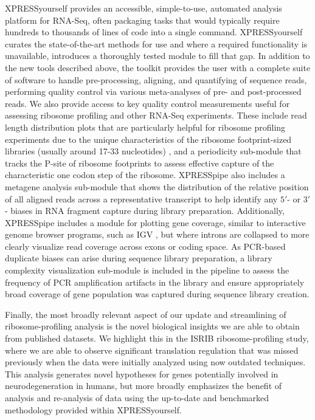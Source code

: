 \documentclass[10pt, oneside]{article}
\begin{document}
\begin{multicols}{2}
XPRESSyourself provides an accessible, simple-to-use, automated analysis platform for RNA-Seq, often packaging tasks that would typically require hundreds to thousands of lines of code into a single command. XPRESSyourself curates the state-of-the-art methods for use and where a required functionality is unavailable, introduces a thoroughly tested module to fill that gap. In addition to the new tools described above, the toolkit provides the user with a complete suite of software to handle pre-processing, aligning, and quantifying of sequence reads, performing quality control via various meta-analyses of pre- and post-processed reads. We also provide access to key quality control measurements useful for assessing ribosome profiling and other RNA-Seq experiments. These include read length distribution plots that are particularly helpful for ribosome profiling experiments due to the unique characteristics of the ribosome footprint-sized libraries (usually around 17-33 nucleotides) \cite{fp_range}, and a periodicity sub-module that tracks the P-site of ribosome footprints to assess effective capture of the characteristic one codon step of the ribosome. XPRESSpipe also includes a metagene analysis sub-module that shows the distribution of the relative position of all aligned reads across a representative transcript to help identify any $5'$- or $3'$- biases in RNA fragment capture during library preparation. Additionally, XPRESSpipe includes a module for plotting gene coverage, similar to interactive genome browser programs, such as IGV \cite{igv}, but where introns are collapsed to more clearly visualize read coverage across exons or coding space. As PCR-based duplicate biases can arise during sequence library preparation, a library complexity visualization sub-module is included in the pipeline to assess the frequency of PCR amplification artifacts in the library and ensure appropriately broad coverage of gene population was captured during sequence library creation. \par

Finally, the most broadly relevant aspect of our update and streamlining of ribosome-profiling analysis is the novel biological insights we are able to obtain from published datasets. We highlight this in the ISRIB ribosome-profiling study, where we are able to observe significant translation regulation that was missed previously when the data were initially analyzed using now outdated techniques. This analysis generates novel hypotheses for genes potentially involved in neurodegeneration in humans, but more broadly emphasizes the benefit of analysis and re-analysis of data using the up-to-date and benchmarked methodology provided within XPRESSyourself.


\end{multicols}
\end{document}

